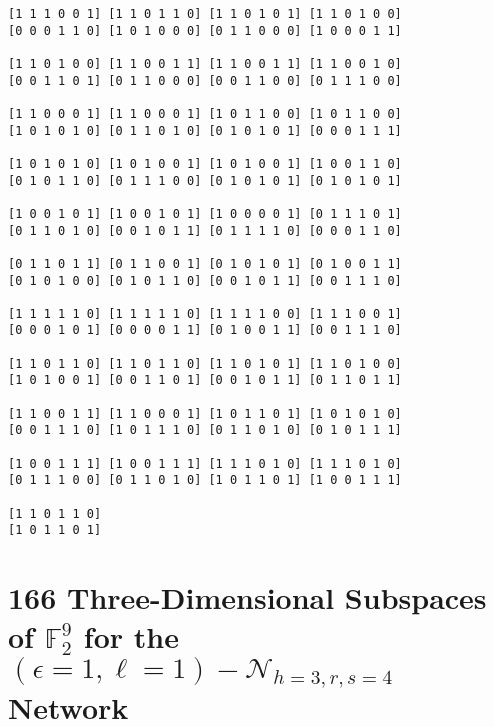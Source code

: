 \begin{lstlisting}
[1 1 1 0 0 1] [1 1 0 1 1 0] [1 1 0 1 0 1] [1 1 0 1 0 0] 
[0 0 0 1 1 0] [1 0 1 0 0 0] [0 1 1 0 0 0] [1 0 0 0 1 1] 

[1 1 0 1 0 0] [1 1 0 0 1 1] [1 1 0 0 1 1] [1 1 0 0 1 0] 
[0 0 1 1 0 1] [0 1 1 0 0 0] [0 0 1 1 0 0] [0 1 1 1 0 0] 

[1 1 0 0 0 1] [1 1 0 0 0 1] [1 0 1 1 0 0] [1 0 1 1 0 0] 
[1 0 1 0 1 0] [0 1 1 0 1 0] [0 1 0 1 0 1] [0 0 0 1 1 1] 

[1 0 1 0 1 0] [1 0 1 0 0 1] [1 0 1 0 0 1] [1 0 0 1 1 0] 
[0 1 0 1 1 0] [0 1 1 1 0 0] [0 1 0 1 0 1] [0 1 0 1 0 1] 

[1 0 0 1 0 1] [1 0 0 1 0 1] [1 0 0 0 0 1] [0 1 1 1 0 1] 
[0 1 1 0 1 0] [0 0 1 0 1 1] [0 1 1 1 1 0] [0 0 0 1 1 0] 

[0 1 1 0 1 1] [0 1 1 0 0 1] [0 1 0 1 0 1] [0 1 0 0 1 1] 
[0 1 0 1 0 0] [0 1 0 1 1 0] [0 0 1 0 1 1] [0 0 1 1 1 0] 

[1 1 1 1 1 0] [1 1 1 1 1 0] [1 1 1 1 0 0] [1 1 1 0 0 1] 
[0 0 0 1 0 1] [0 0 0 0 1 1] [0 1 0 0 1 1] [0 0 1 1 1 0] 

[1 1 0 1 1 0] [1 1 0 1 1 0] [1 1 0 1 0 1] [1 1 0 1 0 0] 
[1 0 1 0 0 1] [0 0 1 1 0 1] [0 0 1 0 1 1] [0 1 1 0 1 1] 

[1 1 0 0 1 1] [1 1 0 0 0 1] [1 0 1 1 0 1] [1 0 1 0 1 0] 
[0 0 1 1 1 0] [1 0 1 1 1 0] [0 1 1 0 1 0] [0 1 0 1 1 1] 

[1 0 0 1 1 1] [1 0 0 1 1 1] [1 1 1 0 1 0] [1 1 1 0 1 0] 
[0 1 1 1 0 0] [0 1 1 0 1 0] [1 0 1 1 0 1] [1 0 0 1 1 1] 

[1 1 0 1 1 0] 
[1 0 1 1 0 1]
\end{lstlisting}


\section{166 Three-Dimensional Subspaces of $\ensuremath{\mathbb{F}}_{2}^{9}$
for the $\left(\epsilon=1,\ell=1\right)-\mathcal{N}_{h=3,r,s=4}$
Network \label{sec:166-Three-Dimensional-Subspaces}}

